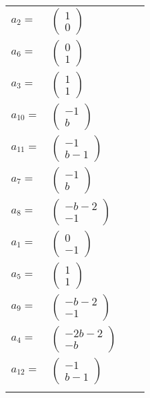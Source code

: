 \documentclass[1p]{elsarticle_modified}
\theoremstyle{definition}
\begin{document}
\begin{tabular}{m{7pt} m{180pt} m{7pt} m{180pt} }
\flushright $a_{2}=$&$\begin{pmatrix}1\\0\end{pmatrix}$ \\
\flushright $a_{6}=$&$\begin{pmatrix}0\\1\end{pmatrix}$ \\
\flushright $a_{3}=$&$\begin{pmatrix}1\\1\end{pmatrix}$ \\
\flushright $a_{10}=$&$\begin{pmatrix}-1\\b\end{pmatrix}$ \\
\flushright $a_{11}=$&$\begin{pmatrix}-1\\b-1\end{pmatrix}$ \\
\flushright $a_{7}=$&$\begin{pmatrix}-1\\b\end{pmatrix}$ \\
\flushright $a_{8}=$&$\begin{pmatrix}- b-2\\-1\end{pmatrix}$ \\
\flushright $a_{1}=$&$\begin{pmatrix}0\\-1\end{pmatrix}$ \\
\flushright $a_{5}=$&$\begin{pmatrix}1\\1\end{pmatrix}$ \\
\flushright $a_{9}=$&$\begin{pmatrix}- b-2\\-1\end{pmatrix}$ \\
\flushright $a_{4}=$&$\begin{pmatrix}-2 b-2\\- b\end{pmatrix}$ \\
\flushright $a_{12}=$&$\begin{pmatrix}-1\\b-1\end{pmatrix}$\\&\end{tabular}
\end{document}
